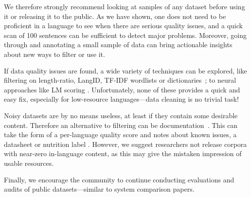 
We therefore strongly recommend looking at samples of any dataset before using it or releasing it to the public. As we have shown, one does not need to be proficient in a language to see when there are serious quality issues, and a quick scan of 100 sentences can be sufficient to detect major problems. Moreover, going through and annotating a small sample of data can bring actionable insights about new ways to filter or use it.

If data quality issues are found, a wide variety of techniques can be explored, like filtering on length-ratio, LangID, TF-IDF wordlists \cite{caswell-etal-2020-language} or dictionaries~\citep{kamholz-etal-2014-panlex}; to neural approaches like LM scoring \cite{axelrod-etal-2011-domain,moore-lewis-2010-intelligent,wang-etal-2018-denoising}. Unfortunately, none of these provides a quick and easy fix, especially for low-resource languages---data cleaning is no trivial task!

Noisy datasets are by no means useless, at least if they contain some desirable content. Therefore an alternative to filtering can be documentation~\citep{bender-etal-2021-on}. This can take the form of a per-language quality score and notes about known issues,
a datasheet \citep{gebru-etal-2018-datasheets} or nutrition label \citep{holland-etal-2018-the}. However, we suggest researchers not release corpora with near-zero in-language content, as this may give the mistaken impression of usable resources.

Finally, we encourage the community to continue conducting evaluations and audits of public datasets---similar to system comparison papers.


